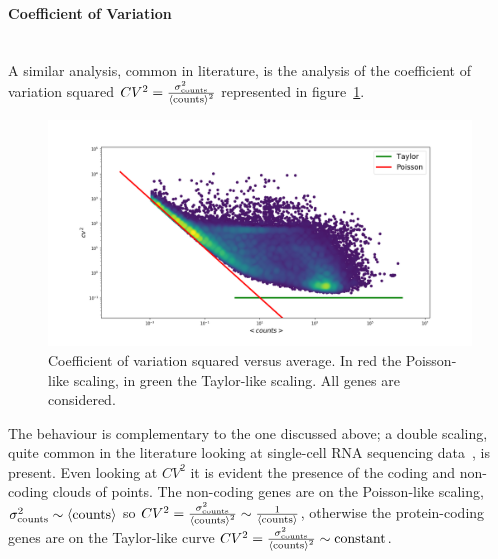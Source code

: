 \paragraph{Coefficient of Variation}\mbox{}\\
A similar analysis, common in literature, is the analysis of the coefficient of variation squared $CV^2=\frac{\sigma^2_{\mathrm{counts}}}{\left\langle \mathrm{counts}\right\rangle^2}$ represented in figure~\ref{fig:scalinglaws/gtex/allgenes/cvmean_loglog}.
\begin{figure}[htb!]
    \centering
    \includegraphics[width=0.9\linewidth]{pictures/scalinglaws/gtex/allgenes/cvmean_loglog.png}
    \caption{Coefficient of variation squared versus average. In \textcolor{pythonred}{red} the Poisson-like scaling, in \textcolor{pythongreen}{green} the Taylor-like scaling. All genes are considered.}
    \label{fig:scalinglaws/gtex/allgenes/cvmean_loglog}
\end{figure}
The behaviour is complementary to the one discussed above; a double scaling, quite common in the literature looking at single-cell RNA sequencing data~\cite{Islam2013}, is present. Even looking at $CV^2$ it is evident the presence of the coding and non-coding clouds of points. The non-coding genes are on the Poisson-like scaling, $\sigma^2_{\mathrm{counts}} \sim \left\langle \mathrm{counts}\right\rangle$ so $CV^2=\frac{\sigma^2_{\mathrm{counts}}}{\left\langle \mathrm{counts}\right\rangle^2}\sim\frac{1}{\left\langle \mathrm{counts}\right\rangle}$, otherwise the protein-coding genes are on the Taylor-like curve $CV^2=\frac{\sigma^2_{\mathrm{counts}}}{\left\langle \mathrm{counts}\right\rangle^2}\sim \text{constant}$.

